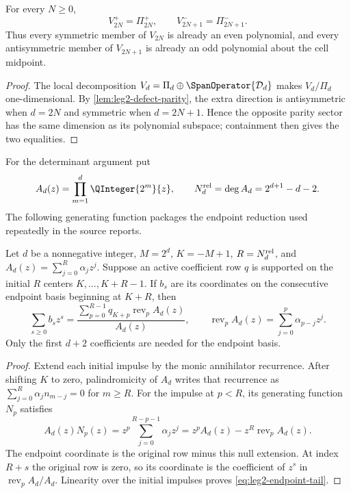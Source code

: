 \begin{theorem}
\label{thm:leg2-parity-split}
For every $N\ge0$,
\begin{equation}
 \boxed{V_{2N}^+=\Pi_{2N}^+,\qquad
 V_{2N+1}^-=\Pi_{2N+1}^-.}
 \label{eq:leg2-parity-split}
\end{equation}
Thus every symmetric member of $V_{2N}$ is already an even polynomial, and
every antisymmetric member of $V_{2N+1}$ is already an odd polynomial about
the cell midpoint.
\end{theorem}

\begin{proof}
The local decomposition
$V_d=\Pi_d\oplus\SpanOperator\{\mathcal D_d\}$ makes $V_d/\Pi_d$
one-dimensional.  By \cref{lem:leg2-defect-parity}, the extra direction is
antisymmetric when $d=2N$ and symmetric when $d=2N+1$.  Hence the opposite
parity sector has the same dimension as its polynomial subspace; containment
then gives the two equalities.
\end{proof}

For the determinant argument put
\begin{equation}
 A_d(z)=\prod_{m=1}^{d}\QInteger{2^m}{z},\qquad
 N_d^{\rm rel}=\deg A_d=2^{d+1}-d-2.
 \label{eq:leg2-annihilator}
\end{equation}
The following generating function packages the endpoint reduction used
repeatedly in the source reports.

\begin{lemma}
\label{lem:leg2-endpoint-tail}
Let $d$ be a nonnegative integer, $M=2^d$, $K=-M+1$,
$R=N_d^{\rm rel}$, and
$A_d(z)=\sum_{j=0}^{R}\alpha_jz^j$.  Suppose an active coefficient
row $q$ is supported on the initial $R$ centers
$K,\ldots,K+R-1$.  If $b_s$ are its coordinates on the consecutive endpoint
basis beginning at $K+R$, then
\begin{equation}
 \boxed{\sum_{s\ge0}b_sz^s=
 \frac{\displaystyle\sum_{p=0}^{R-1}
 q_{K+p}\operatorname{rev}_p A_d(z)}
 {A_d(z)},}
 \qquad
 \operatorname{rev}_p A_d(z)=
 \sum_{j=0}^{p}\alpha_{p-j}z^j.
 \label{eq:leg2-endpoint-tail}
\end{equation}
Only the first $d+2$ coefficients are needed for the endpoint basis.
\end{lemma}

\begin{proof}
Extend each initial impulse by the monic annihilator recurrence.  After
shifting $K$ to zero, palindromicity of $A_d$ writes that recurrence
as $\sum_{j=0}^{R}\alpha_jn_{m-j}=0$ for $m\ge R$.  For the impulse at
$p<R$, its generating function $N_p$ satisfies
\[
 A_d(z)N_p(z)
 =z^p\sum_{j=0}^{R-p-1}\alpha_jz^j
 =z^pA_d(z)-z^R\operatorname{rev}_pA_d(z).
\]
The endpoint coordinate is the original row minus this null extension.  At
index $R+s$ the original row is zero, so its coordinate is the coefficient of
$z^s$ in
$\operatorname{rev}_pA_d/A_d$.  Linearity over the initial
impulses proves \eqref{eq:leg2-endpoint-tail}.
\end{proof}

